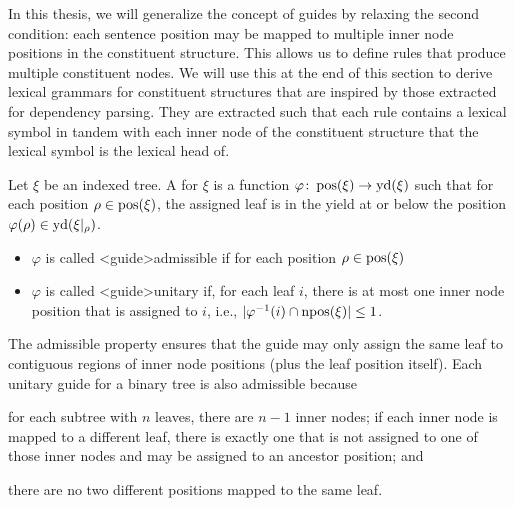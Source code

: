 \documentclass[../../document.tex]{subfiles}
\begin{document}
    In this thesis, we will generalize the concept of guides by relaxing the second condition: each sentence position may be mapped to multiple inner node positions in the constituent structure.
    This allows us to define rules that produce multiple constituent nodes.
    We will use this at the end of this section to derive lexical grammars for constituent structures that are inspired by those extracted for dependency parsing.
    They are extracted such that each rule contains a lexical symbol in tandem with each inner node of the constituent structure that the lexical symbol is the lexical head of.

    \begin{definition}[Guide]\label{def:guide}
        Let \(\xi\) be an indexed tree.
        A  for \(\xi\) is a function \(\varphi\colon \operatorname{pos}(\xi) \to \operatorname{yd}(\xi)\) such that for each position \(\rho \in \operatorname{pos}(\xi)\), the assigned leaf is in the yield at or below the position \(\varphi(\rho) \in \operatorname{yd}(\xi|_\rho)\).
        \begin{itemize}
            \item \(\varphi\) is called <guide>{admissible} if for each position \(\rho \in \operatorname{pos}(\xi)\)
            \item \(\varphi\) is called <guide>{unitary} if, for each leaf \(i\), there is at most one inner node position that is assigned to \(i\), i.e., \(|\varphi^{-1}(i) \cap \operatorname{npos}(\xi)| \leq 1\).
        \end{itemize}
    \end{definition}

    The admissible property ensures that the guide may only assign the same leaf to contiguous regions of inner node positions (plus the leaf position itself).
    Each unitary guide for a binary tree is also admissible because
    \begin{inparaenum}
        \item for each subtree with \(n\) leaves, there are \(n-1\) inner nodes; if each inner node is mapped to a different leaf, there is exactly one that is not assigned to one of those inner nodes and may be assigned to an ancestor position; and
        \item there are no two different positions mapped to the same leaf.
    \end{inparaenum}
\end{document}
